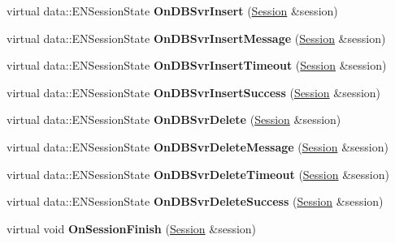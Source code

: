 \begin{DoxyCompactItemize}
\item 
\hypertarget{classBasicHandler_a326117b3a026eceb4873e25f09015d7e}{
virtual data::ENSessionState {\bfseries OnDBSvrInsert} (\hyperlink{classSession}{Session} \&session)}
\label{classBasicHandler_a326117b3a026eceb4873e25f09015d7e}

\item 
\hypertarget{classBasicHandler_a8926ce56cdd44f8626fc7c98aef69330}{
virtual data::ENSessionState {\bfseries OnDBSvrInsertMessage} (\hyperlink{classSession}{Session} \&session)}
\label{classBasicHandler_a8926ce56cdd44f8626fc7c98aef69330}

\item 
\hypertarget{classBasicHandler_aca9e6d86acbb3baa264d8c3a5006142d}{
virtual data::ENSessionState {\bfseries OnDBSvrInsertTimeout} (\hyperlink{classSession}{Session} \&session)}
\label{classBasicHandler_aca9e6d86acbb3baa264d8c3a5006142d}

\item 
\hypertarget{classBasicHandler_a2564f0e113fc55bb9f127ae00c123d52}{
virtual data::ENSessionState {\bfseries OnDBSvrInsertSuccess} (\hyperlink{classSession}{Session} \&session)}
\label{classBasicHandler_a2564f0e113fc55bb9f127ae00c123d52}

\item 
\hypertarget{classBasicHandler_adcd735bc9de92a790cac30018c9e586b}{
virtual data::ENSessionState {\bfseries OnDBSvrDelete} (\hyperlink{classSession}{Session} \&session)}
\label{classBasicHandler_adcd735bc9de92a790cac30018c9e586b}

\item 
\hypertarget{classBasicHandler_a3a42579a69729391dc76c596979ecdfe}{
virtual data::ENSessionState {\bfseries OnDBSvrDeleteMessage} (\hyperlink{classSession}{Session} \&session)}
\label{classBasicHandler_a3a42579a69729391dc76c596979ecdfe}

\item 
\hypertarget{classBasicHandler_a3fec9b9c69af61dc68a5b2552f84588c}{
virtual data::ENSessionState {\bfseries OnDBSvrDeleteTimeout} (\hyperlink{classSession}{Session} \&session)}
\label{classBasicHandler_a3fec9b9c69af61dc68a5b2552f84588c}

\item 
\hypertarget{classBasicHandler_ae704c0d0ddd0e9c953227a5bef02f2d3}{
virtual data::ENSessionState {\bfseries OnDBSvrDeleteSuccess} (\hyperlink{classSession}{Session} \&session)}
\label{classBasicHandler_ae704c0d0ddd0e9c953227a5bef02f2d3}

\item 
\hypertarget{classBasicHandler_a3172859416861fbe0f2dc6170e013972}{
virtual void {\bfseries OnSessionFinish} (\hyperlink{classSession}{Session} \&session)}
\label{classBasicHandler_a3172859416861fbe0f2dc6170e013972}


\end{DoxyCompactItemize}
